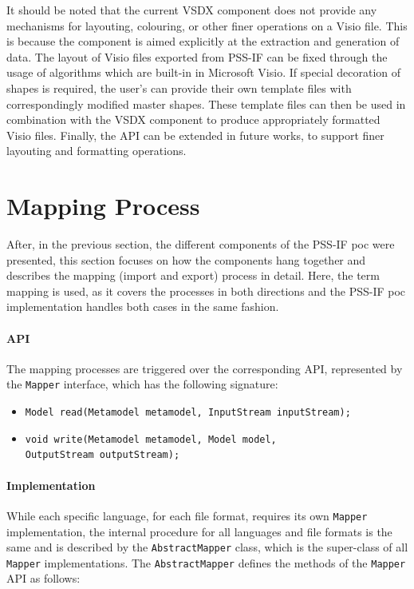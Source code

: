 It should be noted that the current VSDX component does not provide any mechanisms for layouting, colouring, or other finer operations on a Visio file. This is because the component is aimed explicitly at the extraction and generation of data. The layout of Visio files exported from PSS-IF can be fixed through the usage of algorithms which are built-in in Microsoft Visio. If special decoration of shapes is required, the user's can provide their own template files with correspondingly modified master shapes. These template files can then be used in combination with the VSDX component to produce appropriately formatted Visio files. Finally, the API can be extended in future works, to support finer layouting and formatting operations.

\section{Mapping Process}
\label{sec:impl:process}

After, in the previous section, the different components of the PSS-IF \gls{poc} were presented, this section focuses on how the components hang together and describes the mapping (import and export) process in detail. Here, the term mapping is used, as it covers the processes in both directions and the PSS-IF \gls{poc} implementation handles both cases in the same fashion.

\paragraph{API} The mapping processes are triggered over the corresponding API, represented by the \texttt{Mapper} interface, which has the following signature:

\begin{itemize}
\item \texttt{Model read(Metamodel metamodel, InputStream inputStream);}
\item \texttt{void write(Metamodel metamodel, Model model,}\\ \texttt{OutputStream outputStream);}
\end{itemize}

\paragraph{Implementation} While each specific language, for each file format, requires its own \texttt{Mapper} implementation, the internal procedure for all languages and file formats is the same and is described by the \texttt{AbstractMapper} class, which is the super-class of all \texttt{Mapper} implementations. The \texttt{AbstractMapper} defines the methods of the \texttt{Mapper} API as follows:

